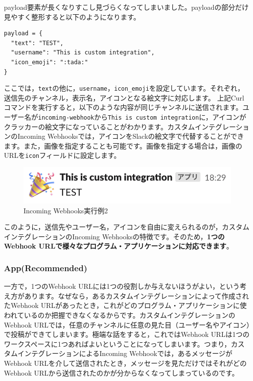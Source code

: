 \documentclass[uplatex,a4j]{jsarticle}
\begin{document}
payload要素が長くなりすこし見づらくなってしまいました。payloadの部分だけ見やすく整形すると以下のようになります。

\begin{lstlisting}[basicstyle=\ttfamily\footnotesize,frame=single,caption=Formed payload,label=formedpayload]
payload = {
  "text": "TEST",
  "username": "This is custom integration",
  "icon_emoji": ":tada:"
}
\end{lstlisting}

ここでは，\verb|text|の他に，\verb|username|，\verb|icon_emoji|を設定しています。それぞれ，送信先のチャンネル，表示名，アイコンとなる絵文字に対応します。
上記Curlコマンドを実行すると，以下のような内容が同じチャンネルに送信されます。ユーザー名が\verb|incoming-webhook|から\verb|This is custom integration|に，アイコンがクラッカーの絵文字になっていることがわかります。カスタムインテグレーションのIncoming Webhooksでは，アイコンをSlackの絵文字で代替することができます。また，画像を指定することも可能です。画像を指定する場合は，画像のURLを\verb|icon|フィールドに設定します。

\begin{figure}[h]
 \centering
 \includegraphics[keepaspectratio, scale=0.8]{images/webhook_sample3.png}
 \caption{Incoming Webhooks実行例2}
 \label{fig:webhook_sample3}
\end{figure}

このように，送信先やユーザー名，アイコンを自由に変えられるのが，カスタムインテグレーションのIncoming Webhooksの特徴です。そのため，\textbf{1つのWebhook URLで様々なプログラム・アプリケーションに対応できます}。

\subsubsection{App(Recommended)}

一方で，1つのWebhook URLには1つの役割しか与えないほうがよい，という考え方があります。なぜなら，あるカスタムインテグレーションによって作成されたWebhook URLがあったとき，これがどのプログラム・アプリケーションに使われているのか把握できなくなるからです。カスタムインテグレーションのWebhook URLでは，任意のチャンネルに任意の見た目（ユーザー名やアイコン）で投稿ができてしまいます。極端な話をすると，これではWebhook URLは1つのワークスペースに1つあればよいということになってしまいます。つまり，カスタムインテグレーションによるIncoming Webhookでは，あるメッセージがWebhook URLを介して送信されたとき，メッセージを見ただけではそれがどのWebhook URLから送信されたのかが分からなくなってしまっているのです。
\end{document}
